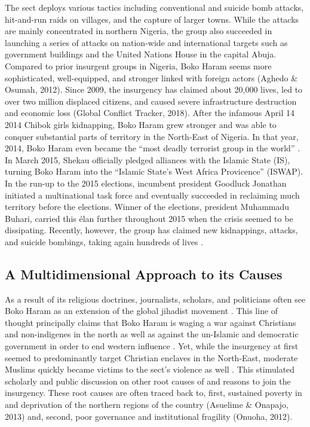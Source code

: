 The sect deploys various tactics including conventional and suicide bomb attacks, hit-and-run raids on villages, and the capture of larger towns. While the attacks are mainly concentrated in northern Nigeria, the group also succeeded in launching a series of attacks on nation-wide and international targets such as government buildings and the United Nations House in the capital Abuja. Compared to prior insurgent groups in Nigeria, Boko Haram seems more sophisticated, well-equipped, and stronger linked with foreign actors (Aghedo \& Osumah, 2012). Since 2009, the insurgency has claimed about 20,000 lives, led to over two million displaced citizens, and caused severe infrastructure destruction and economic loss (Global Conflict Tracker, 2018). After the infamous April 14 2014 Chibok girls kidnapping, Boko Haram grew stronger and was able to conquer substantial parts of territory in the North-East of Nigeria. In that year, 2014, Boko Haram even became the “most deadly terrorist group in the world” \citep{InstituteforEconomics&Peace2015}. In March 2015, Shekau officially pledged alliances with the Islamic State (IS), turning Boko Haram into the “Islamic State’s West Africa Provicence” (ISWAP). In the run-up to the 2015 elections, incumbent president Goodluck Jonathan initiated a multinational task force and eventually succeeded in reclaiming much territory before the elections. Winner of the elections, president Muhammadu Buhari, carried this élan further throughout 2015 when the crisis seemed to be dissipating. Recently, however, the group has claimed new kidnappings, attacks, and suicide bombings, taking again hundreds of lives \citep{AmnestyInternational2018}.


\subsection*{A Multidimensional Approach to its Causes}

As a result of its religious doctrines, journalists, scholars, and politicians often see Boko Haram as an extension of the global jihadist movement \citep[][p.3]{David2015e, Thurston2018}. This line of thought principally claims that Boko Haram is waging a war against Christians and non-indigenes in the north as well as against the un-Islamic and democratic government in order to end western influence \citep{Olaniyan2014}. Yet, while the insurgency at first seemed to predominantly target Christian enclaves in the North-East, moderate Muslims quickly became victims to the sect’s violence as well \citep{PerousedeMontclos2015}. This stimulated scholarly and public discussion on other root causes of and reasons to join the insurgency. These root causes are often traced back to, first, sustained poverty in and deprivation of the northern regions of the country (Asuelime \& Onapajo, 2013) and, second, poor governance and institutional fragility (Onuoha, 2012). 

